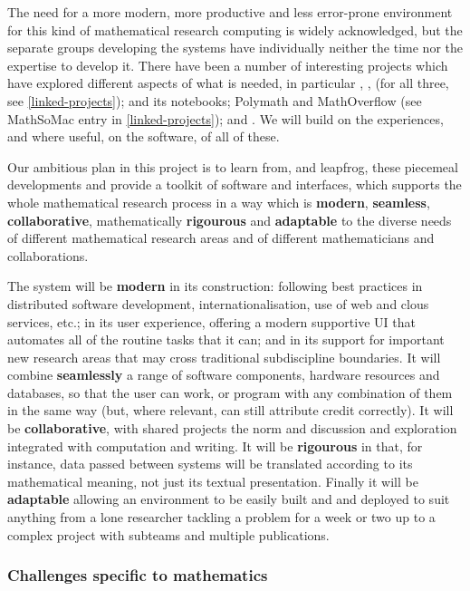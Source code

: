 The need for a more modern, more productive and less error-prone
environment for this kind of mathematical research computing is widely
acknowledged, but the separate groups developing the systems have
individually neither the time nor the expertise to develop it. There
have been a number of interesting projects which have explored
different aspects of what is needed, in particular
\SMC, \HPCGAP, \scienceproject (for all three, see \ref{linked-projects});
\Sage and its notebooks;
Polymath and MathOverflow (see MathSoMac entry in \ref{linked-projects});
and .
We will build on the experiences, and where useful, on the software, of all of these.

Our ambitious plan in this project is to learn from, and leapfrog,
these piecemeal developments and provide a toolkit of software and
interfaces, which supports the whole mathematical research process in
a way which is \textbf{modern}, \textbf{seamless},
\textbf{collaborative}, mathematically \textbf{rigourous} and
\textbf{adaptable} to the diverse needs of different mathematical
research areas and of different mathematicians and collaborations.

The system will be \textbf{modern} in its construction: following
best practices in distributed software development,
internationalisation, use of web and clous services, etc.; in its user
experience, offering a modern supportive UI that automates all of the
routine tasks that it can; and in its support for important new
research areas that may cross traditional subdiscipline boundaries. It
will combine \textbf{seamlessly} a range of software components,
hardware resources and databases, so that the user can work, or
program with any combination of them in the same way (but, where
relevant, can still attribute credit correctly). It will be
\textbf{collaborative}, with shared projects the norm and discussion
and exploration integrated with computation and writing. It will be
\textbf{rigourous} in that, for instance, data passed between systems
will be translated according to its mathematical meaning, not just its
textual presentation. Finally it will be \textbf{adaptable} allowing
an environment to be easily built and and deployed to suit anything
from a lone researcher tackling a problem for a week or two up to a
complex project with subteams and multiple publications.
  

\subsubsection{Challenges specific to  mathematics}

